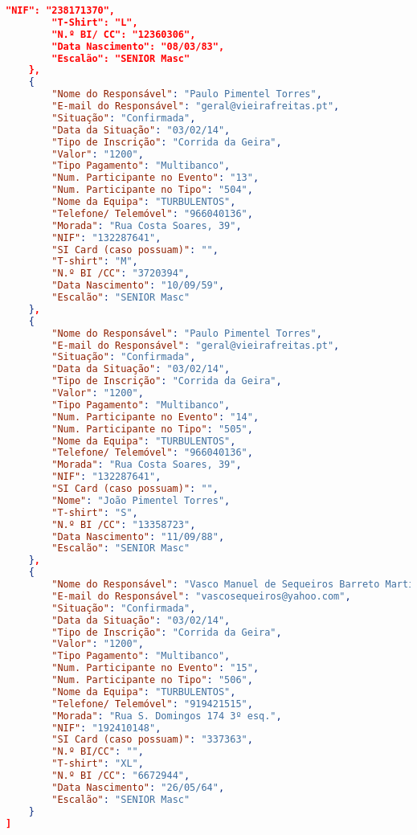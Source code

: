 \documentclass[11pt,a4paper]{report}
\begin{document}
\begin{lstlisting}[language=json,firstnumber=1]
		"NIF": "238171370",
		"T-Shirt": "L",
		"N.º BI/ CC": "12360306",
		"Data Nascimento": "08/03/83",
		"Escalão": "SENIOR Masc"
	},
	{
		"Nome do Responsável": "Paulo Pimentel Torres",
		"E-mail do Responsável": "geral@vieirafreitas.pt",
		"Situação": "Confirmada",
		"Data da Situação": "03/02/14",
		"Tipo de Inscrição": "Corrida da Geira",
		"Valor": "1200",
		"Tipo Pagamento": "Multibanco",
		"Num. Participante no Evento": "13",
		"Num. Participante no Tipo": "504",
		"Nome da Equipa": "TURBULENTOS",
		"Telefone/ Telemóvel": "966040136",
		"Morada": "Rua Costa Soares, 39",
		"NIF": "132287641",
		"SI Card (caso possuam)": "",
		"T-shirt": "M",
		"N.º BI /CC": "3720394",
		"Data Nascimento": "10/09/59",
		"Escalão": "SENIOR Masc"
	},
	{
		"Nome do Responsável": "Paulo Pimentel Torres",
		"E-mail do Responsável": "geral@vieirafreitas.pt",
		"Situação": "Confirmada",
		"Data da Situação": "03/02/14",
		"Tipo de Inscrição": "Corrida da Geira",
		"Valor": "1200",
		"Tipo Pagamento": "Multibanco",
		"Num. Participante no Evento": "14",
		"Num. Participante no Tipo": "505",
		"Nome da Equipa": "TURBULENTOS",
		"Telefone/ Telemóvel": "966040136",
		"Morada": "Rua Costa Soares, 39",
		"NIF": "132287641",
		"SI Card (caso possuam)": "",
		"Nome": "João Pimentel Torres",
		"T-shirt": "S",
		"N.º BI /CC": "13358723",
		"Data Nascimento": "11/09/88",
		"Escalão": "SENIOR Masc"
	},
	{
		"Nome do Responsável": "Vasco Manuel de Sequeiros Barreto Martins de Araújo",
		"E-mail do Responsável": "vascosequeiros@yahoo.com",
		"Situação": "Confirmada",
		"Data da Situação": "03/02/14",
		"Tipo de Inscrição": "Corrida da Geira",
		"Valor": "1200",
		"Tipo Pagamento": "Multibanco",
		"Num. Participante no Evento": "15",
		"Num. Participante no Tipo": "506",
		"Nome da Equipa": "TURBULENTOS",
		"Telefone/ Telemóvel": "919421515",
		"Morada": "Rua S. Domingos 174 3º esq.",
		"NIF": "192410148",
		"SI Card (caso possuam)": "337363",
		"N.º BI/CC": "",
		"T-shirt": "XL",
		"N.º BI /CC": "6672944",
		"Data Nascimento": "26/05/64",
		"Escalão": "SENIOR Masc"
	}
]
        
    \end{lstlisting}

\newpage
	
\end{document}
